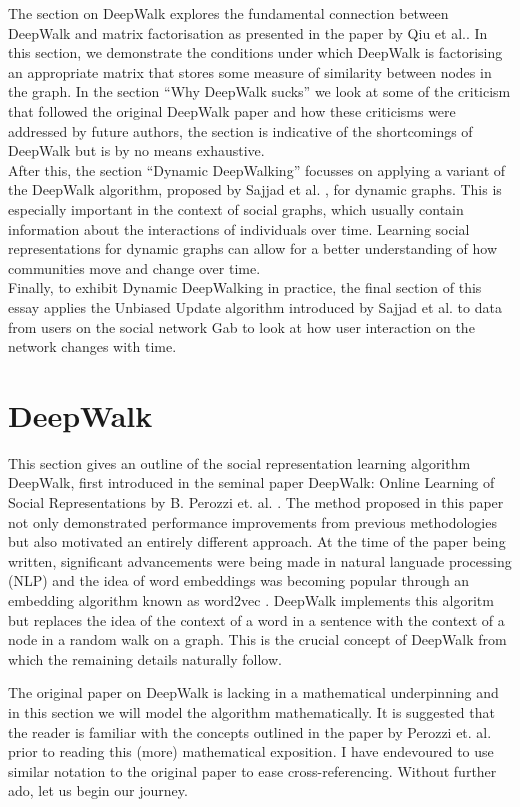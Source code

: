 \documentclass[a4paper]{article}
\begin{document}
The section on DeepWalk explores the fundamental connection between DeepWalk and
matrix factorisation as presented in the paper by Qiu et al.\cite{qiu2018}. In
this section, we demonstrate the conditions under which DeepWalk is factorising
an appropriate matrix that stores some measure of similarity between
nodes in the graph. In the section ``Why DeepWalk sucks'' we look at some of the
criticism that followed the original DeepWalk paper and how these criticisms
were addressed by future authors, the section is indicative of the shortcomings
of DeepWalk but is by no means exhaustive.\\
After this, the section ``Dynamic DeepWalking'' focusses on applying a variant of the DeepWalk algorithm, proposed
by Sajjad et al. \cite{sajjad2019}, for dynamic graphs. This is especially
important in the context of social graphs, which usually contain information
about the interactions of individuals over time. Learning social
representations for dynamic graphs can allow for a better understanding of how
communities move and change over time.\\
Finally, to exhibit Dynamic DeepWalking in practice, the final section of this
essay applies the Unbiased Update algorithm introduced by Sajjad et
al.\cite{sajjad2019} to data from users on the social network Gab to look at how
user interaction on the network changes with time. 

\section{DeepWalk}
This section gives an outline of the social representation learning algorithm
DeepWalk, first introduced in the seminal paper DeepWalk: Online Learning of Social
Representations by B. Perozzi et. al. \cite{deepwalk}. The method proposed in
this paper not only demonstrated performance improvements from previous methodologies but
also motivated an entirely different approach. At the time of the paper being
written, significant advancements were being made in natural languade processing (NLP)
and the idea of word embeddings was becoming popular through an embedding
algorithm known as word2vec \cite{mikolov2013efficient,mikolov2013distributed}.
DeepWalk implements this algoritm but replaces the idea of the context of a word in
a sentence with the context of a node in a random walk on a graph. This is the
crucial concept of DeepWalk from which the remaining details naturally follow.

The original paper on DeepWalk is lacking in a mathematical underpinning and in
this section we will model the algorithm mathematically. It is suggested that the reader
is familiar with the concepts outlined in the paper by Perozzi et. al. prior to
reading this (more) mathematical exposition. I have endevoured to use similar
notation to the original paper to ease cross-referencing. Without further ado, let us begin
our journey.
\end{document}
